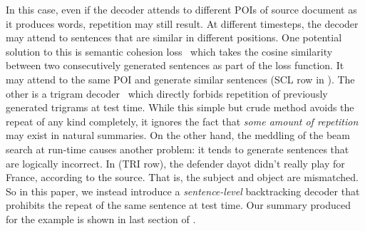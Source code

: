 In this case, even if the decoder attends to different POIs of 
source document as it produces words, repetition may still result.  
At different timesteps,
the decoder may attend 
to sentences that are similar in different positions.
One potential solution to this is semantic cohesion loss~\citep{elikyilmazBHC18}
which takes the cosine similarity between two consecutively generated sentences
as part of the loss function. It may attend to the same POI
and generate similar sentences (SCL row in ).  
The other is a trigram decoder~\citep{PaulusXS17} 
which directly forbids repetition of previously generated trigrams at test time. 
While this simple but crude method avoids the repeat of any kind
completely, 
it ignores the fact that \textit{some amount of repetition} may exist
in natural summaries.  
On the other hand, the meddling of the beam search at run-time causes another problem: 
it tends to generate sentences that are logically incorrect. 
In  (TRI row), the defender dayot didn't
really play for France, according to the source.
That is, the subject and object are mismatched.
So in this paper, we instead introduce a {\em sentence-level} backtracking decoder
that prohibits the repeat of the same sentence at test time.
Our summary produced for the example is shown in last section of 
.

%

